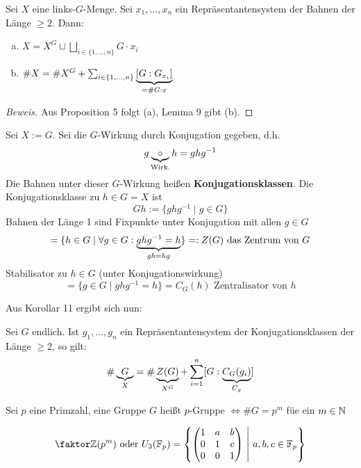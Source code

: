 \documentclass[a4paper]{report}
\begin{document}
\begin{kor}
  Sei $X$ eine links-$G$-Menge. Sei $x_{1}, ..., x_{n}$ ein Repräsentantensystem der Bahnen der Länge $\ge 2$. Dann:
  \begin{enumerate}[(a)]
  \item \(X = X^{G} \sqcup \bigsqcup_{i \in \{1, ..., n\}} G \cdot x_{i}\)
  \item \(\# X = \# X^{G} + \sum_{i \in \{1, ..., n\}}\underbrace{[G:G_{x_{i}}]}_{=\#G \cdot x}\)
  \end{enumerate}
\end{kor}
\begin{proof}[Beweis]
Aus Proposition 5 folgt (a), Lemma 9 gibt (b).
\end{proof}
\begin{anw*}
Sei $X:= G$. Sei die $G$-Wirkung durch Konjugation gegeben, d.h. \[g \underbrace {\circ}_{\text{Wirk.}} h = ghg^{-1}\]
Die Bahnen unter dieser $G$-Wirkung heißen \textbf{Konjugationsklassen}. Die Konjugationsklasse zu $h \in G = X$ ist \[G{h} := \{ghg^{-1} \mid g \in G\}\]
Bahnen der Länge 1 sind Fixpunkte unter Konjugation mit allen $g \in G$
\[= \{h \in G \mid \forall g \in G : \underbrace{ghg^{-1} = h}_{gh = hg} \} =: Z(G) \text{ das Zentrum von }G\]
Stabilisator zu $h \in G$ (unter Konjugationswirkung)
\[ = \{g \in G \mid ghg^{-1} = h\} = C_{G}(h) \text{ Zentralisator von } h\]
\end{anw*}
Aus Korollar 11 ergibt sich nun:

\begin{satz}[Klassengleichung]
  Sei $G$ endlich. Ist $g_{1}, ..., g_{n}$ ein Repräsentantensystem der Konjugationsklassen der Länge $\ge 2$, so gilt:
  \[\# \underbrace{G}_{X} = \#\underbrace{Z(G)}_{X^{G}} + \sum_{i = 1}^{n}[G : \underbrace{C_{G}(g_{i})}_{C_{g}}]\]
\end{satz}

\begin{defi}
Sei $p$ eine Primzahl, eine Gruppe $G$ heißt $p$-Gruppe $\iff \# G = p^{m}$ füe ein $m \in \mathbb{N}$
\end{defi}
\begin{bsp*}
  \[\fak \Z{(p^{m})} \text{ oder } U_{3}(\Bbb F_{p}) =
    \l\{\begin{pmatrix}
      1 & a & b \\
      0 & 1 & c \\
      0 & 0 & 1
  \end{pmatrix} \ \middle | \ a, b, c \in \Bbb F_{p} \r\}\]
\end{bsp*}
\end{document}
